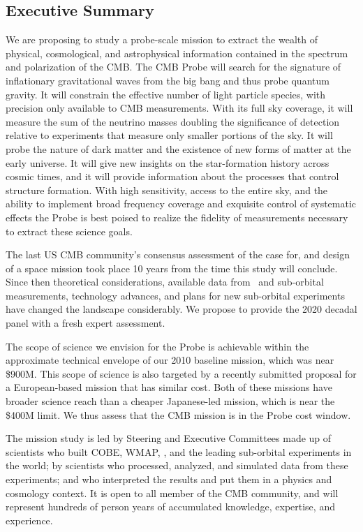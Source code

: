 
\subsection{Executive Summary}
\label{sec:executive}

\vspace{-0.05in}

We are proposing to study a probe-scale mission to extract the wealth 
of physical, cosmological, and astrophysical information contained in the spectrum and polarization of the \ac{CMB}. 
The CMB Probe will search for the signature of inflationary gravitational waves from the big bang 
and thus probe quantum gravity. It will constrain the effective 
number of light particle species, with precision only available to CMB measurements. 
With its full sky coverage, it will measure the sum of the neutrino masses doubling the significance of detection 
relative to experiments that measure only smaller portions of the sky. It will probe 
the nature of dark matter and the existence of new forms of matter at the early universe.  It will 
give new insights on the star-formation history across cosmic times, and it will provide information about 
the processes that control structure formation. 
With high sensitivity, access to the entire sky, and the ability to implement broad frequency coverage 
and exquisite control of systematic effects the Probe is best poised to realize the fidelity of measurements 
necessary to extract these science goals. 

The last US CMB community's consensus assessment of the case for, 
and design of a space mission took place 10 years from the time this study will conclude. 
Since then theoretical considerations, available data from \planck\ and sub-orbital measurements, technology advances, 
and plans for new sub-orbital experiments have changed the landscape considerably. 
We propose to provide the 2020 decadal panel with a fresh expert assessment. 

The scope of science we envision for the Probe is achievable within the approximate technical 
envelope of our 2010 baseline mission, which was near \$900M. This scope of science 
is also targeted by a recently submitted proposal for a European-based mission that has 
similar cost.  Both of these missions have broader science reach than a cheaper Japanese-led mission, which 
is near the \$400M limit. We thus assess that the CMB mission is in the Probe cost window. 

The mission study is led by Steering 
and Executive Committees made up of scientists who built COBE, WMAP, \planck , and the 
leading sub-orbital experiments in the world; by scientists who processed, analyzed, and simulated data from 
these experiments; and who interpreted the results and put them in a physics and cosmology context. 
It is open to all member of the CMB community, and will represent hundreds of person years of 
accumulated knowledge, expertise, and experience. 

